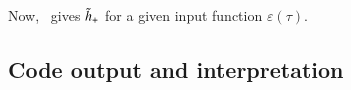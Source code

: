     Now,~ gives $\tilde{h}_+$ for a given input function $\varepsilon(\tau)$. %
    
   









\subsection{Code output and interpretation}\label{sec:PT:gwas:data_comparison}

